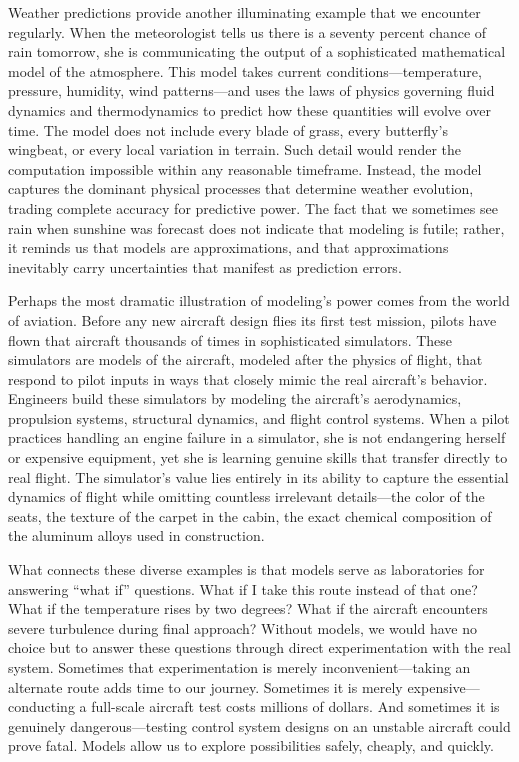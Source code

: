 Weather predictions provide another illuminating example that we encounter regularly. When the meteorologist tells us there is a seventy percent chance of rain tomorrow, she is communicating the output of a sophisticated mathematical model of the atmosphere. This model takes current conditions---temperature, pressure, humidity, wind patterns---and uses the laws of physics governing fluid dynamics and thermodynamics to predict how these quantities will evolve over time. The model does not include every blade of grass, every butterfly's wingbeat, or every local variation in terrain. Such detail would render the computation impossible within any reasonable timeframe. Instead, the model captures the dominant physical processes that determine weather evolution, trading complete accuracy for predictive power. The fact that we sometimes see rain when sunshine was forecast does not indicate that modeling is futile; rather, it reminds us that models are approximations, and that approximations inevitably carry uncertainties that manifest as prediction errors.

Perhaps the most dramatic illustration of modeling's power comes from the world of aviation. Before any new aircraft design flies its first test mission, pilots have flown that aircraft thousands of times in sophisticated simulators. These simulators are models of the aircraft, modeled after the physics of flight, that respond to pilot inputs in ways that closely mimic the real aircraft's behavior. Engineers build these simulators by modeling the aircraft's aerodynamics, propulsion systems, structural dynamics, and flight control systems. When a pilot practices handling an engine failure in a simulator, she is not endangering herself or expensive equipment, yet she is learning genuine skills that transfer directly to real flight. The simulator's value lies entirely in its ability to capture the essential dynamics of flight while omitting countless irrelevant details---the color of the seats, the texture of the carpet in the cabin, the exact chemical composition of the aluminum alloys used in construction.

What connects these diverse examples is that models serve as laboratories for answering ``what if'' questions. What if I take this route instead of that one? What if the temperature rises by two degrees? What if the aircraft encounters severe turbulence during final approach? Without models, we would have no choice but to answer these questions through direct experimentation with the real system. Sometimes that experimentation is merely inconvenient---taking an alternate route adds time to our journey. Sometimes it is merely expensive---conducting a full-scale aircraft test costs millions of dollars. And sometimes it is genuinely dangerous---testing control system designs on an unstable aircraft could prove fatal. Models allow us to explore possibilities safely, cheaply, and quickly.

